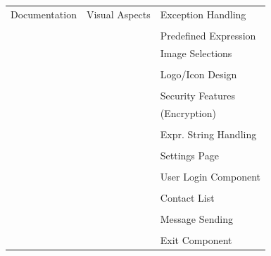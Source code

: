 \documentclass[29pt,a4paper]{moderncv}
\begin{document}
\begin{tabular}{| p{7cm} | p{7cm} | p{7cm} |}
   				\\Documentation & Visual Aspects & Exception Handling\\
   				
   				\\ & & Predefined Expression \\ & & Image Selections\\
				
				\\ & & Logo/Icon Design\\
				
				\\ & & Security Features \\ & &(Encryption)\\
				
				\\ & & Expr. String Handling\\
				
				\\ & & Settings Page\\
				
				\\ & & User Login Component\\
				
				\\ & & Contact List\\
				
				\\ & & Message Sending\\
				
				\\ & & Exit Component\\
			\end{tabular}
			
\end{document}
